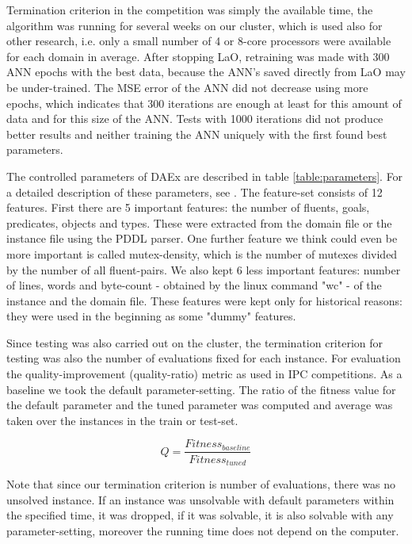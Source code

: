 \documentclass{acm_proc_article-sp}
\begin{document}
Termination criterion in the competition was simply the available time, the algorithm was running for several weeks on our cluster, which is used also for other research, i.e. only a small number of 4 or 8-core processors were available for each domain in average. After stopping LaO, retraining was made with 300 ANN epochs with the best data, because the ANN's saved directly from LaO may be under-trained. The MSE error of the ANN did not decrease using more epochs, which indicates that 300 iterations are enough at least for this amount of data and for this size of the ANN. Tests with 1000 iterations did not produce better results and neither training the ANN uniquely with the first found best parameters.

The controlled parameters of DAEx are described in table \ref{table:parameters}. For a detailed description of these parameters, see \cite{BibGECCO:2010}. The feature-set consists of 12 features. First there are 5 important features: the number of fluents, goals, predicates, objects and types. These were extracted from the domain file or the instance file using the PDDL parser. One further feature we think could even be more important is called mutex-density, which is the number of mutexes divided by the number of all fluent-pairs. We also kept 6 less important features: number of lines, words and byte-count - obtained by the linux command "wc" - of the instance and the domain file. These features were kept only for historical reasons: they were used in the beginning as some "dummy" features.

Since testing was also carried out on the cluster, the termination criterion for testing was also the number of evaluations fixed for each instance. For evaluation the quality-improvement (quality-ratio) metric as used in IPC competitions. As a baseline we took the default parameter-setting. The ratio of the fitness value for the default parameter and the tuned parameter was computed and average was taken over the instances in the train or test-set. 

\begin{equation}Q=\frac{Fitness_{baseline}}{Fitness_{tuned}}\end{equation}

Note that since our termination criterion is number of evaluations, there was no unsolved instance. If an instance was unsolvable with default parameters within the specified time, it was dropped, if it was solvable, it is also solvable with any parameter-setting, moreover the running time does not depend on the computer. 
\end{document}
